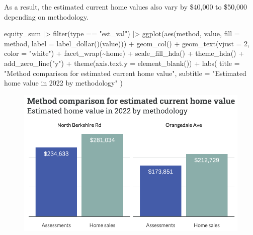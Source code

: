 \documentclass[
  letterpaper,
  DIV=11,
  numbers=noendperiod]{scrartcl}
\newenvironment{Shaded}{\begin{snugshade}}{\end{snugshade}}
\newcommand{\AttributeTok}[1]{\textcolor[rgb]{0.40,0.45,0.13}{#1}}
\newcommand{\DecValTok}[1]{\textcolor[rgb]{0.68,0.00,0.00}{#1}}
\newcommand{\FunctionTok}[1]{\textcolor[rgb]{0.28,0.35,0.67}{#1}}
\newcommand{\NormalTok}[1]{\textcolor[rgb]{0.00,0.23,0.31}{#1}}
\newcommand{\SpecialCharTok}[1]{\textcolor[rgb]{0.37,0.37,0.37}{#1}}
\newcommand{\StringTok}[1]{\textcolor[rgb]{0.13,0.47,0.30}{#1}}
\begin{document}
As a result, the estimated current home values also vary by \$40,000 to
\$50,000 depending on methodology.

\begin{Shaded}
\begin{Highlighting}[]
\NormalTok{equity\_sum }\SpecialCharTok{|\textgreater{}} 
  \FunctionTok{filter}\NormalTok{(type }\SpecialCharTok{==} \StringTok{"est\_val"}\NormalTok{) }\SpecialCharTok{|\textgreater{}} 
  \FunctionTok{ggplot}\NormalTok{(}\FunctionTok{aes}\NormalTok{(method, value, }\AttributeTok{fill =}\NormalTok{ method,}
             \AttributeTok{label =} \FunctionTok{label\_dollar}\NormalTok{()(value))) }\SpecialCharTok{+}
  \FunctionTok{geom\_col}\NormalTok{() }\SpecialCharTok{+}
  \FunctionTok{geom\_text}\NormalTok{(}\AttributeTok{vjust =} \DecValTok{2}\NormalTok{,}
            \AttributeTok{color =} \StringTok{"white"}\NormalTok{) }\SpecialCharTok{+}
  \FunctionTok{facet\_wrap}\NormalTok{(}\SpecialCharTok{\textasciitilde{}}\NormalTok{home) }\SpecialCharTok{+}
  \FunctionTok{scale\_fill\_hda}\NormalTok{() }\SpecialCharTok{+}
  \FunctionTok{theme\_hda}\NormalTok{() }\SpecialCharTok{+}
  \FunctionTok{add\_zero\_line}\NormalTok{(}\StringTok{"y"}\NormalTok{) }\SpecialCharTok{+}
  \FunctionTok{theme}\NormalTok{(}\AttributeTok{axis.text.y =} \FunctionTok{element\_blank}\NormalTok{()) }\SpecialCharTok{+}
  \FunctionTok{labs}\NormalTok{(}
    \AttributeTok{title =} \StringTok{"Method comparison for estimated current home value"}\NormalTok{,}
    \AttributeTok{subtitle =} \StringTok{"Estimated home value in 2022 by methodology"}
\NormalTok{  )}
\end{Highlighting}
\end{Shaded}

\begin{figure}[H]

{\centering \includegraphics{piedmont_files/figure-pdf/comp-3-1.pdf}

}

\end{figure}
\end{document}
